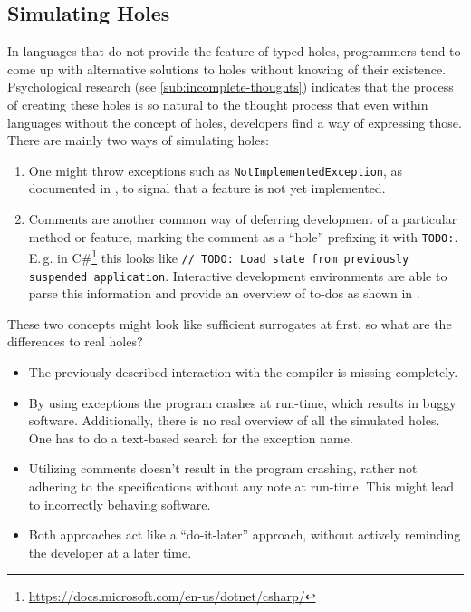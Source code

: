 \subsection{Simulating Holes}
In languages that do not provide the feature of typed holes, programmers tend to come up with alternative solutions to holes without knowing of their existence.
Psychological research (see \cref{sub:incomplete-thoughts}) indicates that the process of creating these holes is so natural to the thought process that even within languages without the concept of holes, developers find a way of expressing those.
There are mainly two ways of simulating holes:
\begin{enumerate}
\item One might throw exceptions such as \verb|NotImplementedException|, as documented in \textcite{microsoft_notimplementedexception_2020}, to signal that a feature is not yet implemented.
\item Comments are another common way of deferring development of a particular method or feature, marking the comment as a ``hole'' prefixing it with \verb|TODO:|. E.\,g. in C\#\footnote{\url{https://docs.microsoft.com/en-us/dotnet/csharp/}} this looks like \verb|// TODO: Load state from previously suspended application|. Interactive development environments are able to parse this information and provide an overview of to-dos as shown in \textcite{hogensen_use_2019}.
\end{enumerate}
These two concepts might look like sufficient surrogates at first, so what are the differences to real holes?
\begin{itemize}
    \item The previously described interaction with the compiler is missing completely.
    \item By using exceptions the program crashes at run-time, which results in buggy software. Additionally, there is no real overview of all the simulated holes. One has to do a text-based search for the exception name.
    \item Utilizing comments doesn't result in the program crashing, rather not adhering to the specifications without any note at run-time. This might lead to incorrectly behaving software.
    \item Both approaches act like a ``do-it-later'' approach, without actively reminding the developer at a later time.
\end{itemize}


